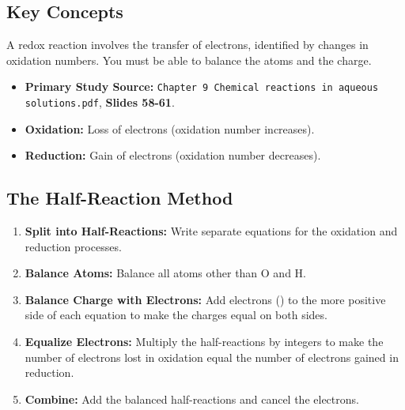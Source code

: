\documentclass{article}
\begin{document}
\subsection*{Key Concepts}
A redox reaction involves the transfer of electrons, identified by changes in oxidation numbers. You must be able to balance the atoms and the charge.
\begin{itemize}[itemsep=5pt]
    \item \textbf{Primary Study Source:} \texttt{Chapter 9 Chemical reactions in aqueous solutions.pdf}, \textbf{Slides 58-61}.
    \item \textbf{Oxidation:} Loss of electrons (oxidation number increases).
    \item \textbf{Reduction:} Gain of electrons (oxidation number decreases).
\end{itemize}

\subsection*{The Half-Reaction Method}
\begin{enumerate}[label=\textbf{Step \arabic*:}, itemsep=5pt]
    \item \textbf{Split into Half-Reactions:} Write separate equations for the oxidation and reduction processes.
    \item \textbf{Balance Atoms:} Balance all atoms other than O and H.
    \item \textbf{Balance Charge with Electrons:} Add electrons () to the more positive side of each equation to make the charges equal on both sides.
    \item \textbf{Equalize Electrons:} Multiply the half-reactions by integers to make the number of electrons lost in oxidation equal the number of electrons gained in reduction.
    \item \textbf{Combine:} Add the balanced half-reactions and cancel the electrons.
\end{enumerate}
\end{document}
